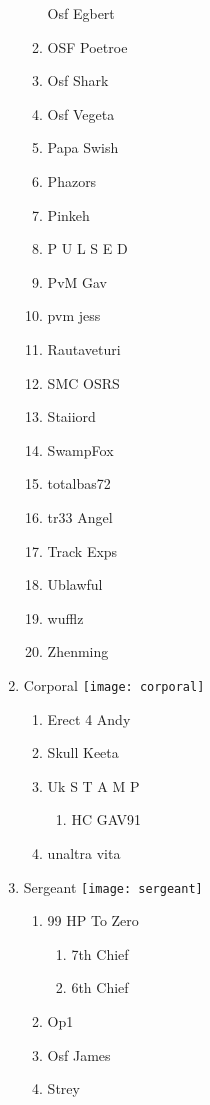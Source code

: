 \documentclass{article}
\begin{document}
\begin{enumerate}[I]
\begin{enumerate}[I]
	Osf Egbert
      \item
	OSF Poetroe
      \item
	Osf Shark
      \item
	Osf Vegeta
      \item
	Papa Swish
      \item
	Phazors
      \item
	Pinkeh
      \item
	P U L S E D
      \item
	PvM Gav
      \item
	pvm jess
      \item
	Rautaveturi
      \item
	SMC OSRS
      \item
	Staiiord
      \item
	SwampFox
      \item
	totalbas72
      \item
	tr33 Angel
      \item
	Track Exps
      \item
	Ublawful
      \item
	wufflz
      \item
	Zhenming
    \end{enumerate}
  \item
    Corporal \texttt{[image: corporal]}
    \begin{enumerate}[I]
      \item
	Erect 4 Andy
      \item
	Skull Keeta
      \item
	Uk S T A M P
	\begin{enumerate}[I]
	  \item
	    HC GAV91
	\end{enumerate}
      \item
	unaltra vita
    \end{enumerate}
  \item
    Sergeant \texttt{[image: sergeant]}
    \begin{enumerate}[I]
      \item 
	99 HP To Zero
	\begin{enumerate}[I]
	  \item
	    7th Chief
	  \item
	    6th Chief
	\end{enumerate}
      \item
	Op1
      \item
	Osf James
      \item
	Strey
    \end{enumerate}

\end{enumerate}
\end{document}
